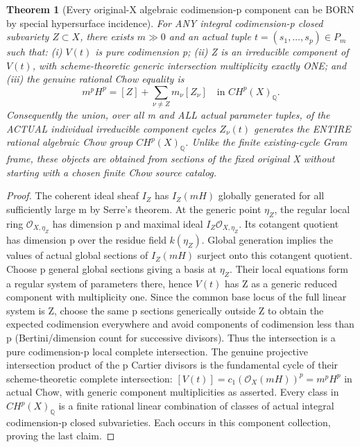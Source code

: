 \documentclass[11pt]{article}
\newcommand{\Q}{\mathbb Q}
\newcommand{\OO}{\mathcal O}
\newtheorem{theorem}{Theorem}
\begin{document}
\begin{theorem}[Every original-X algebraic codimension-p component can be BORN by special hypersurface incidence]
For ANY integral codimension-p closed subvariety \(Z\subset X\),
there exists \(m\gg0\) and an actual tuple
\(t=(s_1,\ldots,s_p)\in P_m\) such that:
(i) \(V(t)\) is pure codimension p;
(ii) Z is an irreducible component of \(V(t)\), with scheme-theoretic
generic intersection multiplicity exactly ONE; and
(iii) the genuine rational Chow equality is
\[
 \boxed{m^p H^p=[Z]+\sum_{\nu\ne Z}m_\nu[Z_\nu]
          \quad\text{in }CH^p(X)_\Q.}                 \tag{1}
\]
Consequently the union, over all m and ALL actual parameter tuples,
of the ACTUAL individual irreducible component cycles \(Z_\nu(t)\)
generates the ENTIRE rational algebraic Chow group \(CH^p(X)_\Q\).
Unlike the finite existing-cycle Gram frame, these objects are obtained
from sections of the fixed original X without starting with a
chosen finite Chow source catalog.
\end{theorem}
\begin{proof}
The coherent ideal sheaf \(I_Z\) has \(I_Z(mH)\) globally
generated for all sufficiently large m by Serre's theorem.
At the generic point \(\eta_Z\), the regular local ring
\(\OO_{X,\eta_Z}\) has dimension p and maximal ideal
\(I_Z\OO_{X,\eta_Z}\). Its cotangent quotient has
dimension p over the residue field \(k(\eta_Z)\).
Global generation implies the values of actual global
sections of \(I_Z(mH)\) surject onto this cotangent quotient.
Choose p general global sections giving a basis at \(\eta_Z\).
Their local equations form a regular system of parameters
there, hence \(V(t)\) has Z as a generic reduced component
with multiplicity one. Since the common base locus of the
full linear system is Z, choose the same p sections generically
outside Z to obtain the expected codimension everywhere and
avoid components of codimension less than p (Bertini/dimension
count for successive divisors). Thus the intersection is
a pure codimension-p local complete intersection.
The genuine projective intersection product of the p
Cartier divisors is the fundamental cycle of their
scheme-theoretic complete intersection:
\( [V(t)]=c_1(\OO_X(mH))^p=m^pH^p\)
in actual Chow, with generic component multiplicities
as asserted. Every class in \(CH^p(X)_\Q\) is a finite rational
linear combination of classes of actual integral
codimension-p closed subvarieties. Each occurs in this
component collection, proving the last claim.
\end{proof}
\end{document}
